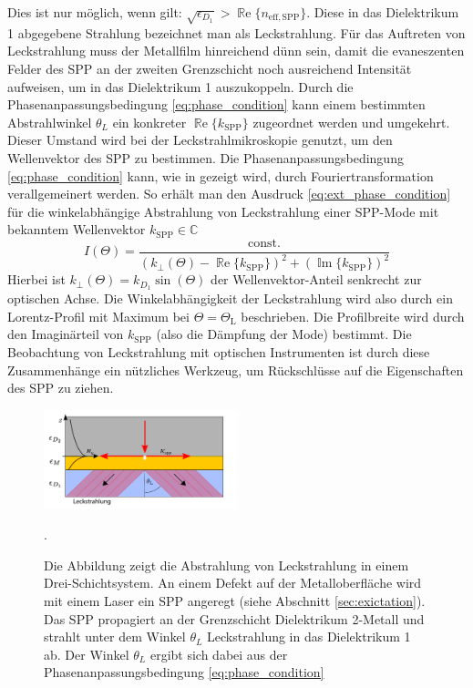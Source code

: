\documentclass[titlepage,  ngerman]{article}
\renewcommand{\Re}{\operatorname{\mathbb{R}e}}
\renewcommand{\Im}{\operatorname{\mathbb{I}m}}
\begin{document}
	Dies ist nur möglich, wenn gilt: {$\sqrt{\epsilon_{D_1}} > \Re\{n_\mathrm{eff, SPP}\}$}. Diese in das Dielektrikum 1 abgegebene Strahlung bezeichnet man als Leckstrahlung. Für das Auftreten von Leckstrahlung muss der Metallfilm hinreichend dünn sein, damit die evaneszenten Felder des  SPP an der zweiten Grenzschicht noch ausreichend Intensität aufweisen, um in das Dielektrikum 1 auszukoppeln. Durch die Phasenanpassungsbedingung \eqref{eq:phase_condition} kann einem bestimmten Abstrahlwinkel $\theta_L$ ein konkreter $\Re\{k_{\mathrm{SPP}}\}$ zugeordnet werden und umgekehrt. Dieser Umstand wird bei der Leckstrahlmikroskopie genutzt, um den Wellenvektor des SPP zu bestimmen.
	Die Phasenanpassungsbedingung \eqref{eq:phase_condition} kann, wie in \cite{Burke.1986} gezeigt wird, durch Fouriertransformation verallgemeinert werden. So erhält man den Ausdruck \eqref{eq:ext_phase_condition} für die winkelabhängige Abstrahlung von Leckstrahlung einer SPP-Mode mit bekanntem Wellenvektor $k_{\mathrm{SPP}} \in \mathbb{C}$
	\begin{equation}
		\label{eq:ext_phase_condition}
		I(\Theta) = \dfrac{\text{const.}}{\left(k_{\perp}(\Theta) - \Re\{k_{\mathrm{SPP}}\}\right)^2 + (\Im\{k_{\mathrm{SPP}}\})^2}
	\end{equation}
	Hierbei ist $k_{\perp}(\Theta) = k_{D_1}\sin(\Theta)$ der Wellenvektor-Anteil senkrecht zur optischen Achse. Die Winkelabhängigkeit der Leckstrahlung wird also durch ein Lorentz-Profil mit Maximum bei $\Theta = \Theta_\mathrm{L}$ beschrieben. Die Profilbreite wird durch den Imaginärteil von $k_{\mathrm{SPP}}$ (also die Dämpfung der Mode) bestimmt. Die Beobachtung von Leckstrahlung mit optischen Instrumenten ist durch diese Zusammenhänge ein nützliches Werkzeug, um Rückschlüsse auf die Eigenschaften des SPP zu ziehen.
	\begin{figure}[h] 
		\centering
		\includegraphics[width=0.5\textwidth]{figures/leckstrahlung.pdf}
		\caption[Leckstrahlung Drei-Schichtsystem]{Die Abbildung zeigt die Abstrahlung von Leckstrahlung in einem Drei-Schichtsystem. An einem Defekt auf der Metalloberfläche wird mit einem Laser ein SPP angeregt (siehe Abschnitt \ref{sec:exictation}). Das SPP propagiert an der Grenzschicht Dielektrikum 2-Metall und strahlt unter dem Winkel $\theta_L$ Leckstrahlung in das Dielektrikum 1 ab. Der Winkel $\theta_L$ ergibt sich dabei aus der Phasenanpassungsbedingung \eqref{eq:phase_condition}}.
		\label{fig:leakage_radiation}
	\end{figure}
\end{document}
